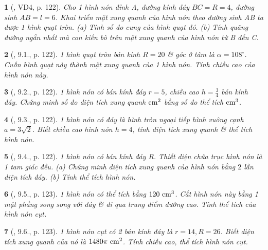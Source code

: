 \documentclass{article}
\newtheorem{baitoan}{}
\begin{document}
\begin{baitoan}[\cite{Binh_boi_duong_Toan_9_tap_2}, VD4, p. 122]
	Cho 1 hình nón đỉnh A, đường kính đáy $BC = R = 4$, đường sinh $AB = l = 6$. Khai triển mặt xung quanh của hình nón theo đường sinh AB ta được 1 hình quạt tròn. (a) Tính số đo cung của hình quạt đó. (b) Tính quãng đường ngắn nhất mà con kiến bò trên mặt xung quanh của hình nón từ B đến C.
\end{baitoan}

\begin{baitoan}[\cite{Binh_boi_duong_Toan_9_tap_2}, 9.1., p. 122]
	1 hình quạt tròn bán kính $R = 20$ \& góc ở tâm là $\alpha = 108^\circ$. Cuốn hình quạt này thành mặt xung quanh của 1 hình nón. Tính chiều cao của hình nón này.
\end{baitoan}

\begin{baitoan}[\cite{Binh_boi_duong_Toan_9_tap_2}, 9.2., p. 122]
	1 hình nón có bán kính đáy $r = 5$, chiều cao $h = \frac{3}{4}$ bán kính đáy. Chứng minh số đo diện tích xung quanh $\rm cm^2$ bằng số đo thể tích $\rm cm^3$.
\end{baitoan}

\begin{baitoan}[\cite{Binh_boi_duong_Toan_9_tap_2}, 9.3., p. 122]
	1 hình nón có đáy là hình tròn ngoại tiếp hình vuông cạnh $a = 3\sqrt{2}$. Biết chiều cao hình nón $h = 4$, tính diện tích xung quanh \& thể tích hình nón.
\end{baitoan}

\begin{baitoan}[\cite{Binh_boi_duong_Toan_9_tap_2}, 9.4., p. 122]
	1 hình nón có bán kính đáy R. Thiết diện chứa trục hình nón là 1 tam giác đều. (a) Chứng minh diện tích xung quanh của hình nón bằng $2$ lần diện tích đáy. (b) Tính thể tích hình nón.
\end{baitoan}

\begin{baitoan}[\cite{Binh_boi_duong_Toan_9_tap_2}, 9.5., p. 123]
	1 hình nón có thể tích bằng $\rm120\ cm^3$. Cắt hình nón này bằng 1 mặt phẳng song song với đáy \& đi qua trung điểm đường cao. Tính thể tích của hình nón cụt.
\end{baitoan}

\begin{baitoan}[\cite{Binh_boi_duong_Toan_9_tap_2}, 9.6., p. 123]
	1 hình nón cụt có 2 bán kính đáy là $r = 14,R = 26$. Biết diện tích xung quanh của nó là $\rm1480\pi\ cm^2$. Tính chiều cao, thể tích hình nón cụt.
\end{baitoan}
\end{document}
